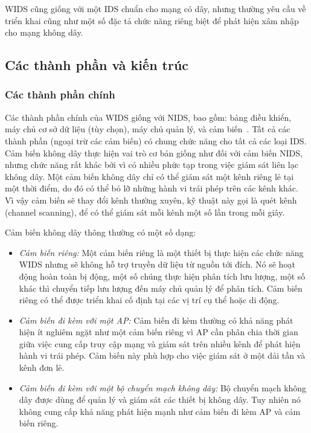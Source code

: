 WIDS cũng giống với một IDS chuẩn cho mạng có dây, nhưng thường yêu cầu về triển khai cũng như một số đặc tả chức năng riêng biệt để phát hiện xâm nhập cho mạng không dây.

\subsection{Các thành phần và kiến trúc}

\subsubsection{Các thành phần chính}
Các thành phần chính của WIDS giống với NIDS, bao gồm: bảng điều khiển, máy chủ cơ sở dữ liệu (tùy chọn), máy chủ quản lý, và cảm biến~\cite{scarfone2007guide}. Tất cả các thành phần (ngoại trừ các cảm biến) có chung chức năng cho tất cả các loại IDS. Cảm biến không dây thực hiện vai trò cơ bản giống như đối với cảm biến NIDS, nhưng chức năng rất khác bởi vì có nhiều phức tạp trong việc giám sát liên lạc không dây. Một cảm biến không dây chỉ có thể giám sát một kênh riêng lẻ tại một thời điểm, do đó có thể bỏ lỡ những hành vi trái phép trên các kênh khác. Vì vậy cảm biến sẽ thay đổi kênh thường xuyên, kỹ thuật này gọi là quét kênh (channel scanning), để có thể giám sát mỗi kênh một số lần trong mỗi giây.

Cảm biến không dây thông thường có một số dạng:
\begin{itemize}
\item \emph{Cảm biến riêng:} \tab Một cảm biến riêng là một thiết bị thực hiện các chức năng WIDS nhưng sẽ không hỗ trợ truyền dữ liệu từ nguồn tới đích. Nó sẽ hoạt động hoàn toàn bị động, một số chúng thực hiện phân tích lưu lượng, một số khác thì chuyển tiếp lưu lượng đến máy chủ quản lý để phân tích. Cảm biến riêng có thể được triển khai cố định tại các vị trí cụ thể hoặc di động.

\item \emph{Cảm biến đi kèm với một AP:} \tab Cảm biến đi kèm thường có khả năng phát hiện ít nghiêm ngặt như một cảm biến riêng vì AP cần phân chia thời gian giữa việc cung cấp truy cập mạng và giám sát trên nhiều kênh để phát hiện hành vi trái phép. Cảm biến này phù hợp cho việc giám sát ở một dải tần và kênh đơn lẻ.

\item \emph{Cảm biến đi kèm với một bộ chuyển mạch không dây:} \tab Bộ chuyển mạch không dây được dùng để quản lý và giám sát các thiết bị không dây. Tuy nhiên nó không cung cấp khả năng phát hiện mạnh như cảm biến đi kèm AP và cảm biến riêng.
\end{itemize}

